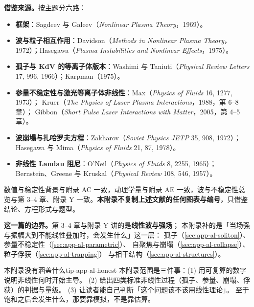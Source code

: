 \textbf{借鉴来源。}按主题分六路：
\begin{itemize}
\item \textbf{框架}：Sagdeev 与 Galeev（\emph{Nonlinear Plasma Theory}，1969）。
\item \textbf{波与粒子相互作用}：Davidson（\emph{Methods in Nonlinear Plasma Theory}，1972）；Hasegawa（\emph{Plasma Instabilities and Nonlinear Effects}，1975）。
\item \textbf{孤子与 KdV 的等离子体版本}：Washimi 与 Taniuti（\emph{Physical Review Letters} 17, 996, 1966）；Karpman（1975）。
\item \textbf{参量不稳定性与激光等离子体非线性}：Max（\emph{Physics of Fluids} 16, 1277, 1973）；
Kruer（\emph{The Physics of Laser Plasma Interactions}，1988，第 6--8 章）；
Gibbon（\emph{Short Pulse Laser Interactions with Matter}，2005，第 4--5 章）。
\item \textbf{波崩塌与扎哈罗夫方程}：Zakharov（\emph{Soviet Physics JETP} 35, 908, 1972）；
Hasegawa 与 Mima（\emph{Physics of Fluids} 21, 87, 1978）。
\item \textbf{非线性 Landau 阻尼}：O'Neil（\emph{Physics of Fluids} 8, 2255, 1965）；
Bernstein、Greene 与 Kruskal（\emph{Physical Review} 108, 546, 1957）。
\end{itemize}

数值与稳定性背景与附录 AC 一致，动理学量与附录 AE 一致，波与不稳定性总览与第 3--4 章、附录 Y 一致。\textbf{本附录不复制上述文献的任何图表与编号}，只借鉴结论、方程形式与题型。

\textbf{这一篇的边界。}第 3--4 章与附录 Y 讲的是\textbf{线性波与强场}；
本附录补的是「当场强与振幅大到不能线性叠加时，会发生什么」这一层：
孤子（\ref{sec:app-al-soliton}）、参量不稳定性（\ref{sec:app-al-parametric}）、
自聚焦与崩塌（\ref{sec:app-al-collapse}）、粒子俘获（\ref{sec:app-al-trapping}）
与相干结构（\ref{sec:app-al-structures}）。

\begin{tip}{本附录没有涵盖什么}{tip-app-al-honest}
本附录范围是三件事：(1) 用可复算的数字说明非线性何时开始主导。
(2) 给出四类标准非线性过程（孤子、参量、崩塌、俘获）的判据与量级。
(3) 让读者能自己判断「这个问题该不该用线性理论」。
至于饱和之后会发生什么，那要靠模拟，不是靠估算。
\end{tip}
\endgroup
